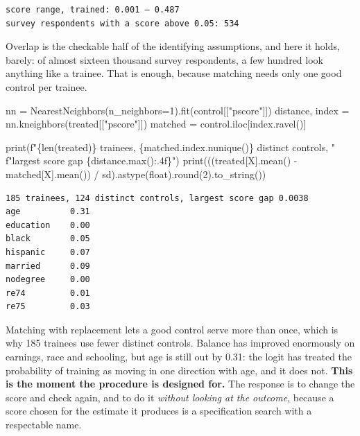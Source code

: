 \documentclass[
  letterpaper,
  10pt,
  twoside,
  openright,
  numbers=noenddot,
  chapterprefix=true]{scrbook}
\newenvironment{Shaded}{}{}
\newcommand{\BuiltInTok}[1]{\textcolor[rgb]{0.84,0.23,0.29}{#1}}
\newcommand{\DecValTok}[1]{\textcolor[rgb]{0.00,0.36,0.77}{#1}}
\newcommand{\NormalTok}[1]{\textcolor[rgb]{0.14,0.16,0.18}{#1}}
\newcommand{\OperatorTok}[1]{\textcolor[rgb]{0.14,0.16,0.18}{#1}}
\newcommand{\SpecialCharTok}[1]{\textcolor[rgb]{0.00,0.36,0.77}{#1}}
\newcommand{\SpecialStringTok}[1]{\textcolor[rgb]{0.01,0.18,0.38}{#1}}
\newcommand{\StringTok}[1]{\textcolor[rgb]{0.01,0.18,0.38}{#1}}
\begin{document}
\begin{verbatim}
score range, trained: 0.001 – 0.487
survey respondents with a score above 0.05: 534
\end{verbatim}

Overlap is the checkable half of the identifying assumptions, and here
it holds, barely: of almost sixteen thousand survey respondents, a few
hundred look anything like a trainee. That is enough, because matching
needs only one good control per trainee.

\label{check-nsw-match1}
\begin{Shaded}
\begin{Highlighting}[]
\NormalTok{nn }\OperatorTok{=}\NormalTok{ NearestNeighbors(n\_neighbors}\OperatorTok{=}\DecValTok{1}\NormalTok{).fit(control[[}\StringTok{"pscore"}\NormalTok{]])}
\NormalTok{distance, index }\OperatorTok{=}\NormalTok{ nn.kneighbors(treated[[}\StringTok{"pscore"}\NormalTok{]])}
\NormalTok{matched }\OperatorTok{=}\NormalTok{ control.iloc[index.ravel()]}

\BuiltInTok{print}\NormalTok{(}\SpecialStringTok{f"}\SpecialCharTok{\{}\BuiltInTok{len}\NormalTok{(treated)}\SpecialCharTok{\}}\SpecialStringTok{ trainees, }\SpecialCharTok{\{}\NormalTok{matched}\SpecialCharTok{.}\NormalTok{index}\SpecialCharTok{.}\NormalTok{nunique()}\SpecialCharTok{\}}\SpecialStringTok{ distinct controls, "}
      \SpecialStringTok{f"largest score gap }\SpecialCharTok{\{}\NormalTok{distance}\SpecialCharTok{.}\BuiltInTok{max}\NormalTok{()}\SpecialCharTok{:.4f\}}\SpecialStringTok{"}\NormalTok{)}
\BuiltInTok{print}\NormalTok{(((treated[X].mean() }\OperatorTok{{-}}\NormalTok{ matched[X].mean()) }\OperatorTok{/}\NormalTok{ sd).astype(}\BuiltInTok{float}\NormalTok{).}\BuiltInTok{round}\NormalTok{(}\DecValTok{2}\NormalTok{).to\_string())}
\end{Highlighting}
\end{Shaded}

\begin{verbatim}
185 trainees, 124 distinct controls, largest score gap 0.0038
age          0.31
education    0.00
black        0.05
hispanic     0.07
married      0.09
nodegree     0.00
re74         0.01
re75         0.03
\end{verbatim}

Matching with replacement lets a good control serve more than once,
which is why 185 trainees use fewer distinct controls. Balance has
improved enormously on earnings, race and schooling, but age is still
out by 0.31: the logit has treated the probability of training as moving
in one direction with age, and it does not. \textbf{This is the moment
the procedure is designed for.} The response is to change the score and
check again, and to do it \emph{without looking at the outcome}, because
a score chosen for the estimate it produces is a specification search
with a respectable name.
\end{document}
